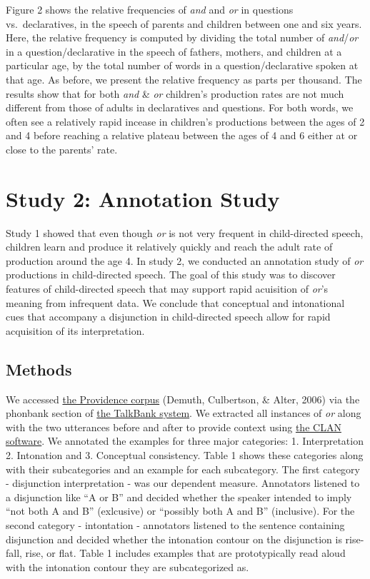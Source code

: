 \documentclass[10pt, letterpaper]{article}
\begin{document}
Figure 2 shows the relative frequencies of \emph{and} and \emph{or} in
questions vs.~declaratives, in the speech of parents and children
between one and six years. Here, the relative frequency is computed by
dividing the total number of \emph{and}/\emph{or} in a
question/declarative in the speech of fathers, mothers, and children at
a particular age, by the total number of words in a question/declarative
spoken at that age. As before, we present the relative frequency as
parts per thousand. The results show that for both \emph{and} \&
\emph{or} children's production rates are not much different from those
of adults in declaratives and questions. For both words, we often see a
relatively rapid incease in children's productions between the ages of 2
and 4 before reaching a relative plateau between the ages of 4 and 6
either at or close to the parents' rate.

\section{Study 2: Annotation Study}\label{study-2-annotation-study}

Study 1 showed that even though \emph{or} is not very frequent in
child-directed speech, children learn and produce it relatively quickly
and reach the adult rate of production around the age 4. In study 2, we
conducted an annotation study of \emph{or} productions in child-directed
speech. The goal of this study was to discover features of
child-directed speech that may support rapid acuisition of \emph{or}'s
meaning from infrequent data. We conclude that conceptual and
intonational cues that accompany a disjunction in child-directed speech
allow for rapid acquisition of its interpretation.

\subsection{Methods}\label{methods-1}

We accessed
\href{https://phonbank.talkbank.org/browser/index.php?url=Eng-NA/Providence/}{the
Providence corpus} (Demuth, Culbertson, \& Alter, 2006) via the phonbank
section of \href{https://talkbank.org/}{the TalkBank system}. We
extracted all instances of \emph{or} along with the two utterances
before and after to provide context using
\href{http://alpha.talkbank.org/clan/}{the CLAN software}. We annotated
the examples for three major categories: 1. Interpretation 2. Intonation
and 3. Conceptual consistency. Table 1 shows these categories along with
their subcategories and an example for each subcategory. The first
category - disjunction interpretation - was our dependent measure.
Annotators listened to a disjunction like ``A or B'' and decided whether
the speaker intended to imply ``not both A and B'' (exlcusive) or
``possibly both A and B'' (inclusive). For the second category -
intontation - annotators listened to the sentence containing disjunction
and decided whether the intonation contour on the disjunction is
rise-fall, rise, or flat. Table 1 includes examples that are
prototypically read aloud with the intonation contour they are
subcategorized as.
\end{document}
